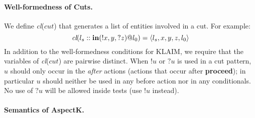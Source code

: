 \documentclass[a4paper]{llncs}
\newcommand{\VF}[1]{{\it cl}($#1$)}
\newcommand{\Lct}{\ell^\lambda}
\newcommand{\Lc}{\ell}
\newcommand{\veck}[1]{\overrightarrow{#1}}
\begin{document}
\paragraph{Well-formedness of Cuts.}

We define \VF{cut} %
that generates a list of entities involved in a cut.  For example:
\[
\textrm{\VF{l_s::\mathbf{in}(!x,y,?z)@l_0}} =  \langle l_s,x,y,z,l_0
\rangle
\]
In addition to the well-formedness conditions for
KLAIM, we require that the variables of \VF{cut} are pairwise distinct. 
When $!u$ or $?u$ is used in a cut pattern, 
$u$ should only occur in the {\em after} actions (actions that occur after
{\bf proceed}); in particular $u$ should neither be used in any before action nor in any conditionals. No use of $?u$ will be allowed inside tests (use $!u$ instead).

\paragraph{Semantics of AspectK.}\label{sec:semantics}
\end{document}
